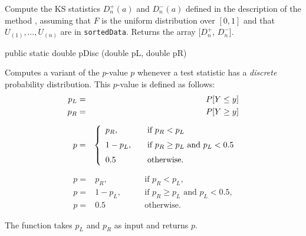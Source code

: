\begin{tabb} Compute the KS statistics $D_n^+(a)$ and $D_n^-(a)$ defined in
  the description of the method
  , assuming that $F$ is the
  uniform distribution over $[0,1]$ and that
  $U_{(1)},\dots,U_{(n)}$ are in \texttt{sortedData}.
  Returns the array [$D_n^+$, $D_n^-$].
 \end{tabb}
\begin{htmlonly}
\end{htmlonly}
\begin{code}

   public static double pDisc (double pL, double pR)\begin{hide} {
      double p;

      if (pR < pL)
         p = pR;
      else if (pL > 0.5)
         p = 0.5;
      else
         p = 1.0 - pL;
      // Note: si p est tres proche de 1, on perd toute la precision ici!
      // Note2: je ne pense pas que cela puisse se produire a cause des if (RS)
      return p;
   }
}\end{hide}
\end{code}
\begin{tabb}  Computes a variant of the $p$-value $p$ whenever a test statistic
  has a {\em discrete\/} probability distribution.
  This $p$-value is defined as follows:
  \begin{eqnarray*}
    p_L & = & P[Y \le y] \\
    p_R & = & P[Y \ge y] \\[6pt]
    p & = & \left\{ \begin{array}{l@{\qquad}l}
        p_R, & \mbox{if } p_R <  p_L \\[6pt]
     1 - p_L, & \mbox{if }
            p_R \ge p_L \mbox{ and }  p_L < 0.5 \\[6pt]
              0.5  &         \mbox{otherwise.}
                    \end{array}  \right.
  \end{eqnarray*}
\begin{htmlonly}
  \[\begin{array}{rll}
   p =& p_R, &\qquad\mbox{if } p_R < p_L, \\
   p =& 1 - p_L, &\qquad\mbox{if } p_R \ge p_L \mbox{ and } p_L < 0.5, \\
   p =& 0.5 &\qquad\mbox{otherwise.}
 \end{array} \]
\end{htmlonly}
  The function takes $p_L$ and $p_R$ as input and returns $p$.
\end{tabb}
\begin{htmlonly}
\end{htmlonly}
